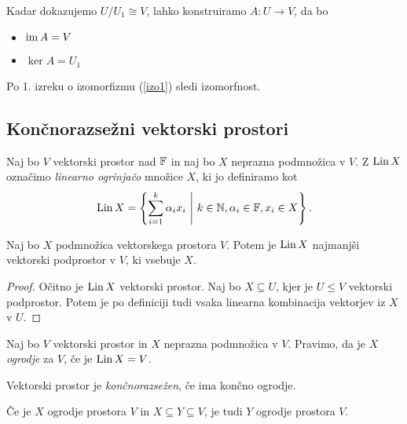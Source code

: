 \documentclass[12pt, a4paper]{article}
\begin{document}
\begin{opomba}
Kadar dokazujemo $U/U_1\cong V$, lahko konstruiramo $A\colon U\to V$, da bo

\begin{itemize}
\item $\operatorname{im} A=V$
\item $\ker A=U_1$
\end{itemize}

Po 1. izreku o izomorfizmu (\ref{izo1}) sledi izomorfnost.
\end{opomba}

\newpage

\subsection{Končnorazsežni vektorski prostori}

\begin{definicija}
Naj bo $V$ vektorski prostor nad $\mathbb{F}$ in naj bo $X$ neprazna podmnožica v $V$. Z $\operatorname{Lin} X$ označimo \emph{linearno ogrinjačo} množice $X$, ki jo definiramo kot
\[
\operatorname{Lin} X=\left\{\sum_{i=1}^k \alpha_ix_i~\middle\vert~k\in\mathbb{N},\alpha_i\in\mathbb{F},x_i\in X\right\}.
\]
\end{definicija}

\begin{trditev}
Naj bo $X$ podmnožica vektorskega prostora $V$. Potem je $\operatorname{Lin} X$ najmanjši vektorski podprostor v $V$, ki vsebuje $X$.
\end{trditev}

\begin{proof}
Očitno je $\operatorname{Lin} X$ vektorski prostor. Naj bo $X\subseteq U$, kjer je $U\leq V$ vektorski podprostor. Potem je po definiciji tudi vsaka linearna kombinacija vektorjev iz $X$ v $U$.
\end{proof}

\begin{definicija}
Naj bo $V$ vektorski prostor in $X$ neprazna podmnožica v $V$. Pravimo, da je $X$ \emph{ogrodje} za $V$, če je $\operatorname{Lin} X=V$.
\end{definicija}

\begin{okvir}
\begin{definicija}
Vektorski prostor je \emph{končnorazsežen}, če ima končno ogrodje.
\end{definicija}
\end{okvir}

\begin{trditev}
Če je $X$ ogrodje prostora $V$ in $X\subseteq Y\subseteq V$, je tudi $Y$ ogrodje prostora $V$.
\end{trditev}
\end{document}

